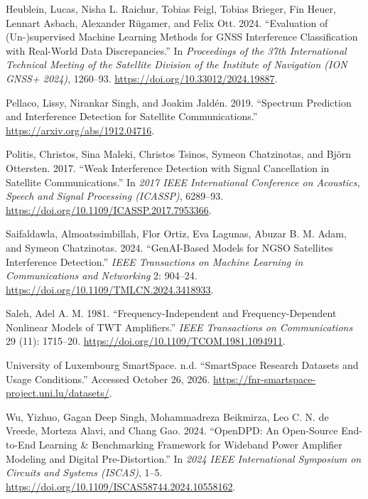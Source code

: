 \documentclass[
  10pt,
]{article}
\newlength{\cslhangindent}
\newenvironment{CSLReferences}[2] %
 {\begin{list}{}{%
  \setlength{\itemindent}{0pt}
  \setlength{\leftmargin}{0pt}
  \setlength{\parsep}{0pt}
  \ifodd #1
   \setlength{\leftmargin}{\cslhangindent}
   \setlength{\itemindent}{-1\cslhangindent}
  \fi
  \setlength{\itemsep}{#2\baselineskip}}}
 {\end{list}}
\begin{document}
\begin{CSLReferences}{1}{0}
Heublein, Lucas, Nisha L. Raichur, Tobias Feigl, Tobias Brieger, Fin
Heuer, Lennart Asbach, Alexander Rügamer, and Felix Ott. 2024.
{``Evaluation of (Un-)supervised Machine Learning Methods for {GNSS}
Interference Classification with Real-World Data Discrepancies.''} In
\emph{Proceedings of the 37th International Technical Meeting of the
Satellite Division of the Institute of Navigation (ION GNSS+ 2024)},
1260--93. \url{https://doi.org/10.33012/2024.19887}.

Pellaco, Lissy, Nirankar Singh, and Joakim Jaldén. 2019. {``Spectrum
Prediction and Interference Detection for Satellite Communications.''}
\url{https://arxiv.org/abs/1912.04716}.

Politis, Christos, Sina Maleki, Christos Tsinos, Symeon Chatzinotas, and
Björn Ottersten. 2017. {``Weak Interference Detection with Signal
Cancellation in Satellite Communications.''} In \emph{2017 IEEE
International Conference on Acoustics, Speech and Signal Processing
(ICASSP)}, 6289--93. \url{https://doi.org/10.1109/ICASSP.2017.7953366}.

Saifaldawla, Almoatssimbillah, Flor Ortiz, Eva Lagunas, Abuzar B. M.
Adam, and Symeon Chatzinotas. 2024. {``{GenAI}-Based Models for {NGSO}
Satellites Interference Detection.''} \emph{IEEE Transactions on Machine
Learning in Communications and Networking} 2: 904--24.
\url{https://doi.org/10.1109/TMLCN.2024.3418933}.

Saleh, Adel A. M. 1981. {``Frequency-Independent and Frequency-Dependent
Nonlinear Models of {TWT} Amplifiers.''} \emph{IEEE Transactions on
Communications} 29 (11): 1715--20.
\url{https://doi.org/10.1109/TCOM.1981.1094911}.

University of Luxembourg SmartSpace. n.d. {``{SmartSpace} Research
Datasets and Usage Conditions.''} Accessed October 26, 2026.
\url{https://fnr-smartspace-project.uni.lu/datasets/}.

Wu, Yizhuo, Gagan Deep Singh, Mohammadreza Beikmirza, Leo C. N. de
Vreede, Morteza Alavi, and Chang Gao. 2024. {``{OpenDPD}: An Open-Source
End-to-End Learning \& Benchmarking Framework for Wideband Power
Amplifier Modeling and Digital Pre-Distortion.''} In \emph{2024 IEEE
International Symposium on Circuits and Systems (ISCAS)}, 1--5.
\url{https://doi.org/10.1109/ISCAS58744.2024.10558162}.

\end{CSLReferences}
\end{document}
